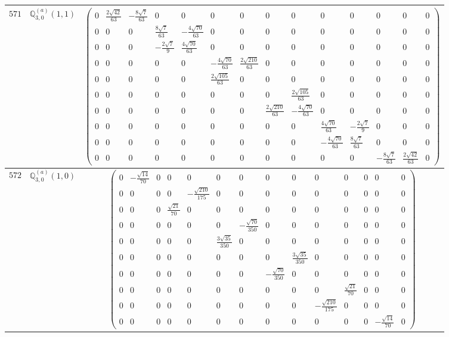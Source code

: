 \documentclass[fleqn,8pt,landscape]{jsarticle}
\begin{document}
\begin{center}
\begin{longtable}{ccc}
$ 571 $ & $ \mathbb{Q}_{3,0}^{(a)}(1,1) $ & $ \begin{pmatrix} 0 & \frac{2 \sqrt{42}}{63} & - \frac{8 \sqrt{7}}{63} & 0 & 0 & 0 & 0 & 0 & 0 & 0 & 0 & 0 & 0 & 0 \\ 0 & 0 & 0 & \frac{8 \sqrt{7}}{63} & - \frac{4 \sqrt{70}}{63} & 0 & 0 & 0 & 0 & 0 & 0 & 0 & 0 & 0 \\ 0 & 0 & 0 & - \frac{2 \sqrt{7}}{9} & \frac{4 \sqrt{70}}{63} & 0 & 0 & 0 & 0 & 0 & 0 & 0 & 0 & 0 \\ 0 & 0 & 0 & 0 & 0 & - \frac{4 \sqrt{70}}{63} & \frac{2 \sqrt{210}}{63} & 0 & 0 & 0 & 0 & 0 & 0 & 0 \\ 0 & 0 & 0 & 0 & 0 & \frac{2 \sqrt{105}}{63} & 0 & 0 & 0 & 0 & 0 & 0 & 0 & 0 \\ 0 & 0 & 0 & 0 & 0 & 0 & 0 & 0 & \frac{2 \sqrt{105}}{63} & 0 & 0 & 0 & 0 & 0 \\ 0 & 0 & 0 & 0 & 0 & 0 & 0 & \frac{2 \sqrt{210}}{63} & - \frac{4 \sqrt{70}}{63} & 0 & 0 & 0 & 0 & 0 \\ 0 & 0 & 0 & 0 & 0 & 0 & 0 & 0 & 0 & \frac{4 \sqrt{70}}{63} & - \frac{2 \sqrt{7}}{9} & 0 & 0 & 0 \\ 0 & 0 & 0 & 0 & 0 & 0 & 0 & 0 & 0 & - \frac{4 \sqrt{70}}{63} & \frac{8 \sqrt{7}}{63} & 0 & 0 & 0 \\ 0 & 0 & 0 & 0 & 0 & 0 & 0 & 0 & 0 & 0 & 0 & - \frac{8 \sqrt{7}}{63} & \frac{2 \sqrt{42}}{63} & 0 \end{pmatrix} $ \\ \hline
$ 572 $ & $ \mathbb{Q}_{3,0}^{(a)}(1,0) $ & $ \begin{pmatrix} 0 & - \frac{\sqrt{14}}{70} & 0 & 0 & 0 & 0 & 0 & 0 & 0 & 0 & 0 & 0 & 0 & 0 \\ 0 & 0 & 0 & 0 & - \frac{\sqrt{210}}{175} & 0 & 0 & 0 & 0 & 0 & 0 & 0 & 0 & 0 \\ 0 & 0 & 0 & \frac{\sqrt{21}}{70} & 0 & 0 & 0 & 0 & 0 & 0 & 0 & 0 & 0 & 0 \\ 0 & 0 & 0 & 0 & 0 & 0 & - \frac{\sqrt{70}}{350} & 0 & 0 & 0 & 0 & 0 & 0 & 0 \\ 0 & 0 & 0 & 0 & 0 & \frac{3 \sqrt{35}}{350} & 0 & 0 & 0 & 0 & 0 & 0 & 0 & 0 \\ 0 & 0 & 0 & 0 & 0 & 0 & 0 & 0 & \frac{3 \sqrt{35}}{350} & 0 & 0 & 0 & 0 & 0 \\ 0 & 0 & 0 & 0 & 0 & 0 & 0 & - \frac{\sqrt{70}}{350} & 0 & 0 & 0 & 0 & 0 & 0 \\ 0 & 0 & 0 & 0 & 0 & 0 & 0 & 0 & 0 & 0 & \frac{\sqrt{21}}{70} & 0 & 0 & 0 \\ 0 & 0 & 0 & 0 & 0 & 0 & 0 & 0 & 0 & - \frac{\sqrt{210}}{175} & 0 & 0 & 0 & 0 \\ 0 & 0 & 0 & 0 & 0 & 0 & 0 & 0 & 0 & 0 & 0 & 0 & - \frac{\sqrt{14}}{70} & 0 \end{pmatrix} $ \\ \hline

\end{longtable}
\end{center}
\end{document}
